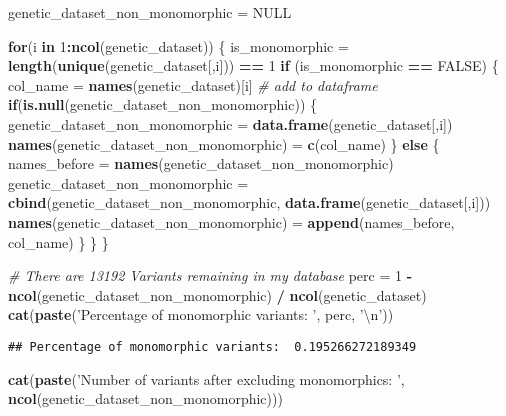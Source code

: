 \documentclass[
]{article}
\newenvironment{Shaded}{\begin{snugshade}}{\end{snugshade}}
\newcommand{\CharTok}[1]{\textcolor[rgb]{0.31,0.60,0.02}{#1}}
\newcommand{\CommentTok}[1]{\textcolor[rgb]{0.56,0.35,0.01}{\textit{#1}}}
\newcommand{\ControlFlowTok}[1]{\textcolor[rgb]{0.13,0.29,0.53}{\textbf{#1}}}
\newcommand{\DecValTok}[1]{\textcolor[rgb]{0.00,0.00,0.81}{#1}}
\newcommand{\KeywordTok}[1]{\textcolor[rgb]{0.13,0.29,0.53}{\textbf{#1}}}
\newcommand{\NormalTok}[1]{#1}
\newcommand{\OperatorTok}[1]{\textcolor[rgb]{0.81,0.36,0.00}{\textbf{#1}}}
\newcommand{\OtherTok}[1]{\textcolor[rgb]{0.56,0.35,0.01}{#1}}
\newcommand{\StringTok}[1]{\textcolor[rgb]{0.31,0.60,0.02}{#1}}
\begin{document}
\begin{Shaded}
\begin{Highlighting}[]
\NormalTok{genetic_dataset_non_monomorphic =}\StringTok{ }\OtherTok{NULL}

\ControlFlowTok{for}\NormalTok{(i }\ControlFlowTok{in} \DecValTok{1}\OperatorTok{:}\KeywordTok{ncol}\NormalTok{(genetic_dataset)) \{}
\NormalTok{  is_monomorphic =}\StringTok{ }\KeywordTok{length}\NormalTok{(}\KeywordTok{unique}\NormalTok{(genetic_dataset[,i])) }\OperatorTok{==}\StringTok{ }\DecValTok{1}
  \ControlFlowTok{if}\NormalTok{ (is_monomorphic }\OperatorTok{==}\StringTok{ }\OtherTok{FALSE}\NormalTok{) \{}
\NormalTok{    col_name =}\StringTok{ }\KeywordTok{names}\NormalTok{(genetic_dataset)[i]}
    \CommentTok{# add to dataframe}
    \ControlFlowTok{if}\NormalTok{(}\KeywordTok{is.null}\NormalTok{(genetic_dataset_non_monomorphic)) \{}
\NormalTok{      genetic_dataset_non_monomorphic =}\StringTok{ }\KeywordTok{data.frame}\NormalTok{(genetic_dataset[,i])}
      \KeywordTok{names}\NormalTok{(genetic_dataset_non_monomorphic) =}\StringTok{ }\KeywordTok{c}\NormalTok{(col_name)}
\NormalTok{    \} }\ControlFlowTok{else}\NormalTok{ \{}
\NormalTok{      names_before =}\StringTok{ }\KeywordTok{names}\NormalTok{(genetic_dataset_non_monomorphic)}
\NormalTok{      genetic_dataset_non_monomorphic =}\StringTok{ }\KeywordTok{cbind}\NormalTok{(genetic_dataset_non_monomorphic, }\KeywordTok{data.frame}\NormalTok{(genetic_dataset[,i]))}
      \KeywordTok{names}\NormalTok{(genetic_dataset_non_monomorphic) =}\StringTok{ }\KeywordTok{append}\NormalTok{(names_before, col_name)}
\NormalTok{    \}}
\NormalTok{  \}}
\NormalTok{\}}


\CommentTok{# There are 13192 Variants remaining in my database}
\NormalTok{perc =}\StringTok{ }\DecValTok{1} \OperatorTok{-}\StringTok{ }\KeywordTok{ncol}\NormalTok{(genetic_dataset_non_monomorphic) }\OperatorTok{/}\StringTok{ }\KeywordTok{ncol}\NormalTok{(genetic_dataset)}
\KeywordTok{cat}\NormalTok{(}\KeywordTok{paste}\NormalTok{(}\StringTok{'Percentage of monomorphic variants: '}\NormalTok{, perc, }\StringTok{'}\CharTok{\textbackslash{}n}\StringTok{'}\NormalTok{))}
\end{Highlighting}
\end{Shaded}

\begin{verbatim}
## Percentage of monomorphic variants:  0.195266272189349
\end{verbatim}

\begin{Shaded}
\begin{Highlighting}[]
\KeywordTok{cat}\NormalTok{(}\KeywordTok{paste}\NormalTok{(}\StringTok{'Number of variants after excluding monomorphics: '}\NormalTok{, }\KeywordTok{ncol}\NormalTok{(genetic_dataset_non_monomorphic)))}
\end{Highlighting}
\end{Shaded}
\end{document}
